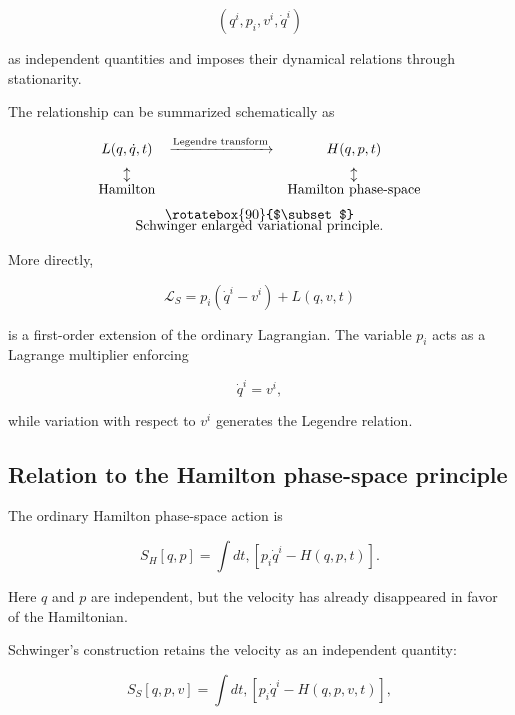 $$
(q^i,p_i,v^i,\dot q^i)
$$

as independent quantities and imposes their dynamical relations through stationarity.

The relationship can be summarized schematically as

\begin{equation}
\begin{array}{ccc}
L(q,\dot q,t)
&
\xrightarrow{\text{Legendre transform}}
&
H(q,p,t)\\
[6pt]
\updownarrow
&
&
\updownarrow\\
[-1pt]
\text{Hamilton}
&
&
\text{Hamilton phase-space}\\
[6pt]
\multicolumn{3}{c}{
\rotatebox{90}{$\subset$}
}\\
[-4pt]
\multicolumn{3}{c}{
\text{Schwinger enlarged variational principle}.
}
\end{array}
\end{equation}

More directly,

\begin{equation}
\boxed{
\mathcal L_S=p_i(\dot q^i-v^i)+L(q,v,t)
}
\end{equation}

is a first-order extension of the ordinary Lagrangian. The variable \(p_i\) acts as a Lagrange multiplier enforcing

$$
\dot q^i=v^i,
$$

while variation with respect to \(v^i\) generates the Legendre relation.

\subsection{Relation to the Hamilton phase-space principle}

The ordinary Hamilton phase-space action is

\begin{equation}
S_H[q,p]=
\int dt,
\left[
p_i\dot q^i-H(q,p,t)
\right].
\end{equation}

Here \(q\) and \(p\) are independent, but the velocity has already disappeared in favor of the Hamiltonian.

Schwinger's construction retains the velocity as an independent quantity:

\begin{equation}
S_S[q,p,v]=
\int dt,
\left[
p_i\dot q^i-
H(q,p,v,t)
\right],
\end{equation}

